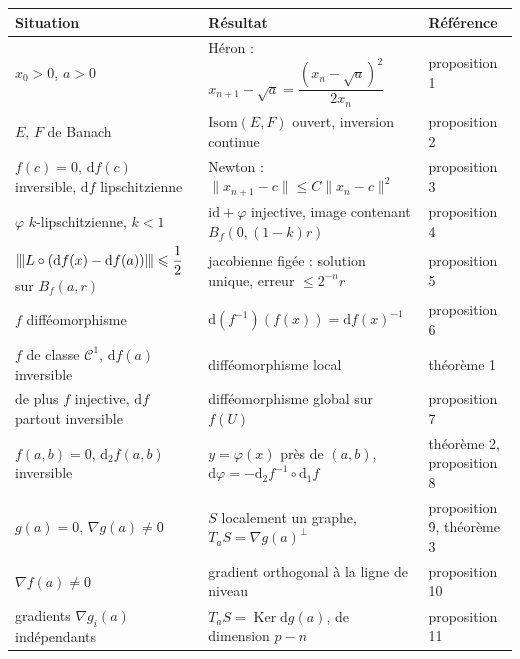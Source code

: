 \documentclass[a4paper,twoside]{report}
\newcommand{\id}{\mathrm{id}}                     %
\newcommand{\dd}{\mathrm{d}}                      %
\newcommand{\Ker}{\operatorname{Ker}}
\newcommand{\norme}[1]{\lVert #1 \rVert}         %
\newcommand{\nop}[1]{|\mkern-1.5mu|\mkern-1.5mu|#1|\mkern-1.5mu|\mkern-1.5mu|}   %
\newcommand{\Bf}{B_{f}}                           %
\newcommand{\Cc}{\mathcal{C}}                     %
\newcommand{\Isom}{\mathrm{Isom}}                 %
\newcommand{\grad}{\nabla}                        %
\begin{document}
\begin{center}
\renewcommand{\arraystretch}{1.35}
\begin{tabularx}{15cm}{|>{\raggedright\arraybackslash}p{4.3cm}|>{\raggedright\arraybackslash}X|>{\centering\arraybackslash}p{2.4cm}|}
\hline
\rowcolor{couleurD!35} \textbf{Situation} & \textbf{Résultat} & \textbf{Référence} \\ \hline
$x_{0} > 0$, $a > 0$ & Héron : $x_{n + 1} - \sqrt{a} = \dfrac{(x_{n} - \sqrt{a})^{2}}{2x_{n}}$ & proposition 1 \\ \hline
$E$, $F$ de Banach & $\Isom(E, F)$ ouvert, inversion continue & proposition 2 \\ \hline
$f(c) = 0$, $\dd f(c)$ inversible, $\dd f$ lipschitzienne & Newton : $\norme{x_{n + 1} - c} \leqslant C\norme{x_{n} - c}^{2}$ & proposition 3 \\ \hline
$\varphi$ $k$-lipschitzienne, $k < 1$ & $\id + \varphi$ injective, image contenant $\Bf(0, (1 - k)r)$ & proposition 4 \\ \hline
$\nop{L \circ (\dd f(x) - \dd f(a))} \leqslant \dfrac{1}{2}$ sur $\Bf(a, r)$ & jacobienne figée : solution unique, erreur $\leqslant 2^{-n}r$ & proposition 5 \\ \hline
$f$ difféomorphisme & $\dd(f^{-1})(f(x)) = \dd f(x)^{-1}$ & proposition 6 \\ \hline
$f$ de classe $\Cc^{1}$, $\dd f(a)$ inversible & difféomorphisme local & théorème 1 \\ \hline
de plus $f$ injective, $\dd f$ partout inversible & difféomorphisme global sur $f(U)$ & proposition 7 \\ \hline
$f(a, b) = 0$, $\dd_{2} f(a, b)$ inversible & $y = \varphi(x)$ près de $(a, b)$, $\dd\varphi = -\dd_{2} f^{-1} \circ \dd_{1} f$ & théorème 2, proposition 8 \\ \hline
$g(a) = 0$, $\grad g(a) \neq 0$ & $S$ localement un graphe, $T_{a}S = \grad g(a)^{\perp}$ & proposition 9, théorème 3 \\ \hline
$\grad f(a) \neq 0$ & gradient orthogonal à la ligne de niveau & proposition 10 \\ \hline
gradients $\grad g_{i}(a)$ indépendants & $T_{a}S = \Ker \dd g(a)$, de dimension $p - n$ & proposition 11 \\ \hline
\end{tabularx}
\end{center}
\end{document}
